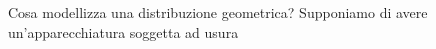 
\ParteEsercizi

\Esercizio{}

\ParteSoluzioni

\Soluzione{}
\begin{oss}
Cosa modellizza una distribuzione geometrica? Supponiamo di avere un'apparecchiatura soggetta ad usura
\end{oss}